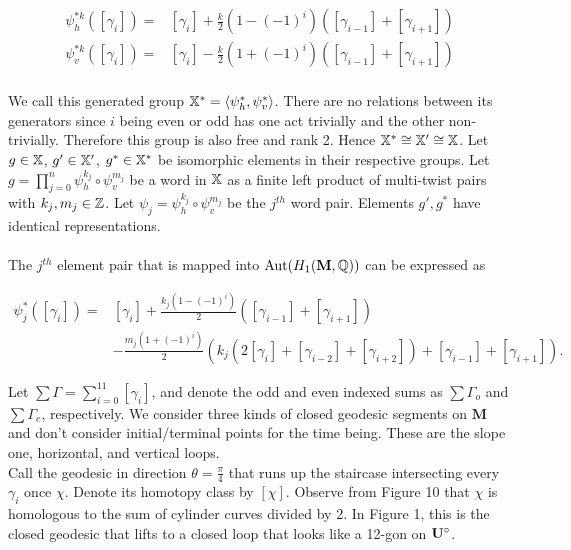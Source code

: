 \documentclass[]{article}
\def\bM{\mathbf{M}}
\def\<{\langle} \def\>{\rangle}
\def\Aut{\mathrm{Aut}}
\begin{document}
\begin{align*}
\psi^{*k}_h([\gamma_i])=&[\gamma_i] + \frac{k}{2}(1-(-1)^i)([\gamma_{i-1}]+[\gamma_{i+1}])\\
\psi^{*k}_v([\gamma_i])=&[\gamma_i] - \frac{k}{2}(1+(-1)^i)([\gamma_{i-1}]+[\gamma_{i+1}])\\
\end{align*}

We call this generated group $\XX^*=\<\psi^{*}_h,\psi^{*}_v \>$. There are no relations between its generators since $i$ being even or odd has one act trivially and the other non-trivially. Therefore this group is also free and rank 2. Hence $\mathbb{X}^*\cong\mathbb{X}'\cong\mathbb{X}$. Let $g\in\mathbb{X}$, $g'\in\mathbb{X}'$, $g^*\in\mathbb{X}^*$ be isomorphic elements in their respective groups. Let $g=\prod_{j=0}^{n}\psi_h^{k_j}\circ\psi_v^{m_j}$ be a word in $\mathbb{X}$ as a finite left product of multi-twist pairs with $k_j,m_j\in\mathbb{Z}$. Let $\psi_j=\psi_h^{k_j}\circ\psi_v^{m_j}$ be the $j^{th}$ word pair. Elements $g',g^*$ have identical representations. \\\\
The $j^{th}$ element pair that is mapped into $\Aut(H_1(\bM,\QQ))$ can be expressed as 

\begin{align*}
\psi_j^*([\gamma_i])=&[\gamma_i]+\frac{k_j(1-(-1)^i)}{2}([\gamma_{i-1}]+[\gamma_{i+1}])\\&-\frac{m_j(1+(-1)^i)}{2}(k_j(2[\gamma_i]+[\gamma_{i-2}]+[\gamma_{i+2}]) +[\gamma_{i-1}]+[\gamma_{i+1}]).
\end{align*}

\noindent Let $\sum\Gamma=\sum_{i=0}^{11}[\gamma_i]$, and denote the odd and even indexed sums as $\sum\Gamma_o$ and $\sum\Gamma_e$, respectively. We consider three kinds of closed geodesic segments on $\bM$ and don't consider initial/terminal points for the time being. These are the slope one, horizontal, and vertical loops.\\



\noindent Call the geodesic in direction $\theta=\frac{\pi}{4}$ that runs up the staircase intersecting every $\gamma_i$ once $\chi$. Denote its homotopy class by $[\chi]$. Observe from Figure 10 that $\chi$ is homologous to the sum of cylinder curves divided by 2. In Figure 1, this is the closed geodesic that lifts to a closed loop that looks like a 12-gon on $\mathbf{U}^\circ$.  
\end{document}
